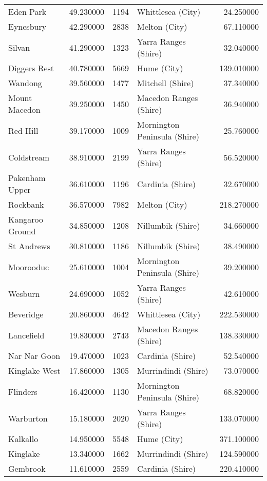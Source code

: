 \begin{table}
\begin{tabular}{lrrlr}
Eden Park & 49.230000 & 1194 & Whittlesea (City) & 24.250000 \\
Eynesbury & 42.290000 & 2838 & Melton (City) & 67.110000 \\
Silvan & 41.290000 & 1323 & Yarra Ranges (Shire) & 32.040000 \\
Diggers Rest & 40.780000 & 5669 & Hume (City) & 139.010000 \\
Wandong & 39.560000 & 1477 & Mitchell (Shire) & 37.340000 \\
Mount Macedon & 39.250000 & 1450 & Macedon Ranges (Shire) & 36.940000 \\
Red Hill & 39.170000 & 1009 & Mornington Peninsula (Shire) & 25.760000 \\
Coldstream & 38.910000 & 2199 & Yarra Ranges (Shire) & 56.520000 \\
Pakenham Upper & 36.610000 & 1196 & Cardinia (Shire) & 32.670000 \\
Rockbank & 36.570000 & 7982 & Melton (City) & 218.270000 \\
Kangaroo Ground & 34.850000 & 1208 & Nillumbik (Shire) & 34.660000 \\
St Andrews & 30.810000 & 1186 & Nillumbik (Shire) & 38.490000 \\
Moorooduc & 25.610000 & 1004 & Mornington Peninsula (Shire) & 39.200000 \\
Wesburn & 24.690000 & 1052 & Yarra Ranges (Shire) & 42.610000 \\
Beveridge & 20.860000 & 4642 & Whittlesea (City) & 222.530000 \\
Lancefield & 19.830000 & 2743 & Macedon Ranges (Shire) & 138.330000 \\
Nar Nar Goon & 19.470000 & 1023 & Cardinia (Shire) & 52.540000 \\
Kinglake West & 17.860000 & 1305 & Murrindindi (Shire) & 73.070000 \\
Flinders & 16.420000 & 1130 & Mornington Peninsula (Shire) & 68.820000 \\
Warburton & 15.180000 & 2020 & Yarra Ranges (Shire) & 133.070000 \\
Kalkallo & 14.950000 & 5548 & Hume (City) & 371.100000 \\
Kinglake & 13.340000 & 1662 & Murrindindi (Shire) & 124.590000 \\
Gembrook & 11.610000 & 2559 & Cardinia (Shire) & 220.410000 \\
\end{tabular}
\end{table}
